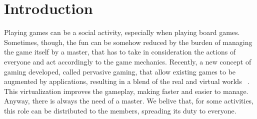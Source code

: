 \section{Introduction}

Playing games can be a social activity, especially when playing board games. 
Sometimes, though, the fun can be somehow reduced by the burden of managing the 
game itself by a master, that has to take in consideration the actions of 
everyone and act accordingly to the game mechanics. Recently, a new  concept of 
gaming developed, called pervasive gaming, that allow existing games to be 
augmented by applications, resulting in a blend of the real and virtual worlds 
~\cite{arango17}.
This virtualization improves the gameplay, making faster and easier to manage. 
Anyway, there is always the need of a master. We belive that, for some 
activities, this role can be distributed to the members, spreading its duty to 
everyone. 